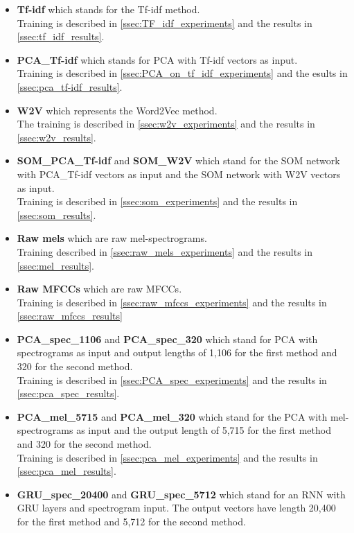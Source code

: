 \begin{itemize}
     \item \textbf{Tf-idf} which stands for the Tf-idf method. \\
        Training is described in \ref{ssec:TF_idf_experiments} and the results in \ref{ssec:tf_idf_results}.
    \item \textbf{PCA\_Tf-idf} which stands for PCA with Tf-idf vectors as input. \\
    Training is described in \ref{ssec:PCA_on_tf_idf_experiments} and the esults in \ref{ssec:pca_tf-idf_results}.
    \item \textbf{W2V} which represents the Word2Vec method. \\
        The training is described in \ref{ssec:w2v_experiments} and the results in \ref{ssec:w2v_results}.
    \item \textbf{SOM\_PCA\_Tf-idf} and \textbf{SOM\_W2V} which stand for the SOM network with PCA\_Tf-idf vectors as input and the SOM network with W2V vectors as input. \\
            Training is described in \ref{ssec:som_experiments} and the results in \ref{ssec:som_results}.
    \item \textbf{Raw mels} which are raw mel-spectrograms. \\
             Training described in \ref{ssec:raw_mels_experiments} and the results in \ref{ssec:mel_results}.
    \item \textbf{Raw MFCCs} which are raw MFCCs. \\
        Training is described in \ref{ssec:raw_mfccs_experiments} and the results in \ref{ssec:raw_mfccs_results}
    \item \textbf{PCA\_spec\_1106} and \textbf{PCA\_spec\_320} which stand for PCA with spectrograms as input and output lengths of 1,106 for the first method and 320 for the second method. \\
        Training is described in \ref{ssec:PCA_spec_experiments} and the results in \ref{ssec:pca_spec_results}.
    \item \textbf{PCA\_mel\_5715} and \textbf{PCA\_mel\_320} which stand for the PCA with mel-spectrograms as input and the output length of 5,715 for the first method and 320 for the second method. \\
        Training is described in \ref{ssec:pca_mel_experiments} and the results in \ref{ssec:pca_mel_results}.
    \item \textbf{GRU\_spec\_20400} and \textbf{GRU\_spec\_5712} which stand for an RNN with GRU layers and spectrogram input. The output vectors have length 20,400 for the first method and 5,712 for the second method. \\

\end{itemize}
